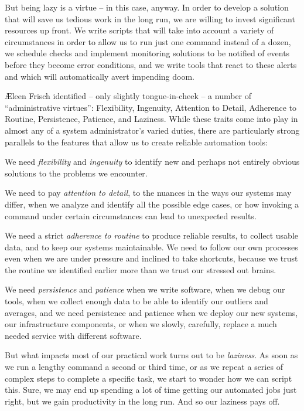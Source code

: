 But being lazy is a virtue -- in this case, anyway.
In order to develop a solution that will save us
tedious work in the long run, we are willing to invest
significant resources up front.  We write scripts that
will take into account a variety of circumstances in
order to allow us to run just one command instead of a
dozen, we schedule checks and implement monitoring
solutions to be notified of events before they become
error conditions, and we write tools that react to
these alerts and which will automatically avert
impending doom.

\AE leen Frisch identified\cite{automation:frisch} --
only slightly tongue-in-cheek -- a number of
``administrative virtues'': Flexibility, Ingenuity,
Attention to Detail, Adherence to Routine,
Persistence, Patience, and Laziness.  While these
traits come into play in almost any of a system
administrator's varied duties, there are particularly
strong parallels to the features that allow us to
create reliable automation tools:

We need {\em flexibility} and {\em ingenuity} to
identify new and perhaps not entirely obvious
solutions to the problems we encounter.

We need to pay {\em attention to detail}, to the
nuances in the ways our systems may differ, when we
analyze and identify all the possible edge cases, or
how invoking a command under certain circumstances can
lead to unexpected results.

We need a strict {\em adherence to routine} to produce
reliable results, to collect usable data, and to keep
our systems maintainable.  We need to follow our own
processes even when we are under pressure and inclined
to take shortcuts, because we trust the routine we
identified earlier more than we trust our stressed out
brains.

We need {\em persistence} and {\em patience} when we write
software, when we debug our tools, when we collect
enough data to be able to identify our outliers and
averages, and we need persistence and patience when we
deploy our new systems, our infrastructure components,
or when we slowly, carefully, replace a much needed
service with different software.

But what impacts most of our practical work turns out
to be {\em laziness}.  As soon as we run a lengthy command a
second or third time, or as we repeat a series of
complex steps to complete a specific task, we start to
wonder how we can script this.  Sure, we may end up
spending a lot of time getting our automated jobs just
right, but we gain productivity in the long run.  And
so our laziness pays off.

